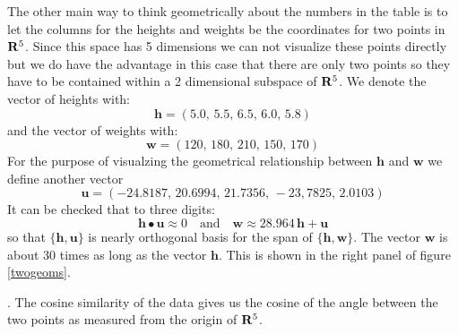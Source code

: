    The other main way to think geometrically about the numbers in the table is 
to let the columns for the heights and weights be the coordinates for two 
points in ${\bf R}^5$.  Since this space has 5 dimensions we can not visualize 
these points directly but we do have the advantage in this case that there are 
only two points so they have to be contained within a 2 dimensional subspace
of ${\bf R}^5$.  We denote the vector of heights with:
\begin{equation*}
\mathbf{h} = (5.0,\, 5.5,\, 6.5,\, 6.0,\, 5.8)
\end{equation*}
and the vector of weights with:
\begin{equation*}
\mathbf{w} = (120,\, 180,\, 210,\, 150,\, 170)
\end{equation*}
For the purpose of visualzing the geometrical relationship between 
$\mathbf{h}$ and $\mathbf{w}$ we define another vector
\begin{equation*}
\mathbf{u} = (-24.8187,\, 20.6994,\, 21.7356,\, -23,7825,\, 2.0103)
\end{equation*}
It can be checked that to three digits:
\begin{equation*}
\mathbf{h} \bullet \mathbf{u} \approx 0 \quad \mbox{and} \quad
\mathbf{w} \approx 28.964 \, \mathbf{h} + \mathbf{u}
\end{equation*}
so that $\{ \mathbf{h}, \mathbf{u} \}$ is nearly orthogonal basis for the span
of $\{ \mathbf{h}, \mathbf{w} \}$.  The vector $\mathbf{w}$ is about $30$ 
times as long as the vector $\mathbf{h}$.  This is shown in the right panel of
figure \ref{twogeoms}.


.  The cosine 
similarity of the data gives us the cosine of the angle between the two points 
as measured from the origin of ${\bf R}^5$.

